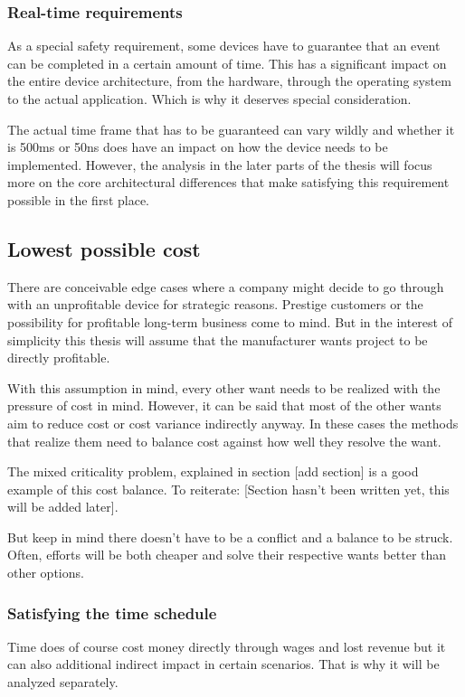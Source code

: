\subsubsection{Real-time requirements}
As a special safety requirement, some devices have to guarantee that an event can be completed in a certain amount of time. This has a significant impact on the entire device architecture, from the hardware, through the operating system to the actual application. Which is why it deserves special consideration.

The actual time frame that has to be guaranteed can vary wildly and whether it is 500ms or 50ns does have an impact on how the device needs to be implemented. However, the analysis in the later parts of the thesis will focus more on the core architectural differences that make satisfying this requirement possible in the first place. 

\subsection{Lowest possible cost}
There are conceivable edge cases where a company might decide to go through with an unprofitable device for strategic reasons. Prestige customers or the possibility for profitable long-term business come to  mind. But in the interest of simplicity this thesis will assume that the manufacturer wants project to be directly profitable.

With this assumption in mind, every other want needs to be realized with the pressure of cost in mind. However, it can be said that most of the other wants aim to reduce cost or cost variance indirectly anyway. In these cases the methods that realize them need to balance cost against how well they resolve the want.

The mixed criticality problem, explained in section [add section] is a good example of this cost balance. To reiterate: [Section hasn't been written yet, this will be added later]. 

But keep in mind there doesn't have to be a conflict and a balance to be struck. Often, efforts will be both cheaper and solve their respective wants better than other options.

\subsubsection{Satisfying the time schedule}
Time does of course cost money directly through wages and lost revenue but it can also additional indirect impact in certain scenarios. That is why it will be analyzed separately.

